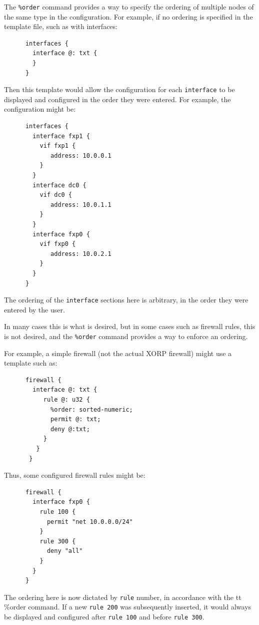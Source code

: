 \documentclass[11pt]{article}
\begin{document}
The {\tt \%order} command provides a way to specify the ordering of
multiple nodes of the same type in the configuration.  For example, if
no ordering is specified in the template file, such as with interfaces:

\begin{verbatim}
      interfaces {
        interface @: txt {
        }
      }
\end{verbatim}

\noindent Then this template would allow the configuration for each
{\tt interface} to be displayed and configured in the order they were
entered.  For example, the configuration might be:

\begin{verbatim}
      interfaces {
        interface fxp1 {
          vif fxp1 {
             address: 10.0.0.1
          }
        }
        interface dc0 {
          vif dc0 {
             address: 10.0.1.1
          }
        }
        interface fxp0 {
          vif fxp0 {
             address: 10.0.2.1
          }
        }
      }
\end{verbatim}

\noindent The ordering of the {\tt interface} sections here is
arbitrary, in the order they were entered by the user.

\noindent In many cases this is what is desired, but in some cases such as
firewall rules, this is not desired, and the {\tt \%order} command
provides a way to enforce an ordering.

\noindent For example, a simple firewall (not the actual XORP firewall) might
use a template such as:
\begin{verbatim}
      firewall {
        interface @: txt {
           rule @: u32 {
             %order: sorted-numeric;
             permit @: txt;
             deny @:txt;
           }
         }
       }
\end{verbatim}

\noindent Thus, some configured firewall rules might be:
\begin{verbatim}
      firewall {
        interface fxp0 {
          rule 100 {
            permit "net 10.0.0.0/24"
          }
          rule 300 {
            deny "all"
          }
        }
      }
\end{verbatim}

\noindent The ordering here is now dictated by {\tt rule} number, in accordance
with the {tt \%order} command.  If a new {\tt rule 200} was
subsequently inserted, it would always be displayed and configured
after {\tt rule 100} and before {\tt rule 300}.
\end{document}
